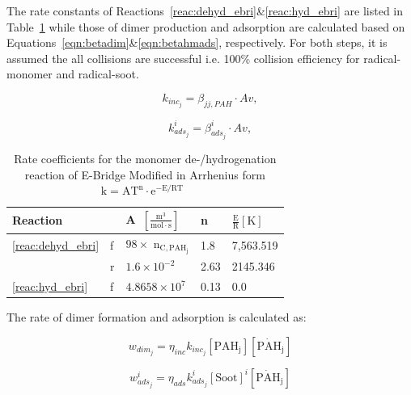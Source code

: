 

The rate constants of Reactions~\eqref{reac:dehyd_ebri}\&\eqref{reac:hyd_ebri} are listed in Table~\ref{tab:Ebridge} while those of dimer production and adsorption are calculated based on Equations~\eqref{eqn:betadim}\&\eqref{eqn:betahmads}, respectively. For both steps, it is assumed the all collisions are successful i.e. 100\% collision efficiency for radical-monomer and radical-soot.

\begin{equation}
	k_{inc_j}=
	\beta_{jj,PAH}\cdot Av
	\label{eqn:kdim_ebri},
\end{equation}

\begin{equation}
	k^i_{ads_{j}}=
	\beta^i_{ads_j}\cdot Av
	\label{eqn:kads_ebir},
\end{equation}

\begin{table}
	\caption{Rate coefficients for the monomer de-/hydrogenation reaction of E-Bridge Modified in Arrhenius form $\mathrm{k=AT^n\cdot e^{-E/RT}}$~\citep{frenklach2020mechanism}}
	\label{tab:Ebridge}
	\centering
	\begin{tabular}{l l l l l}
		\hline
		Reaction & \hspace{0.1cm} & A~$\mathrm{\left[ \frac{m^3}{mol\cdot s} \right]}$ & n & $\mathrm{\frac{E}{R} [K]}$  \\
		\hline
		\eqref{reac:dehyd_ebri} & f & $98\times$ $\mathrm{n_{C, PAH_j}}$ & 1.8 & 7,563.519 \\
		& r & $1.6\times 10^{-2}$ & 2.63 & 2145.346\\
		\eqref{reac:hyd_ebri} & f & $4.8658\times10^7
		$ & 0.13 & 0.0\\
		\hline
	\end{tabular}
\end{table}

The rate of dimer formation and adsorption is calculated as:

\begin{equation}
	w_{dim_j} = \eta_{inc} k_{inc_{j}} [\mathrm{PAH_j}] [\mathrm{\dot{PAH}_j}]
	\label{eqn:wdim_ebri}
\end{equation}

\begin{equation}
	w^i_{ads_j} = \eta_{ads} k^i_{ads_{j}} [\mathrm{Soot}]^i [\mathrm{\dot{PAH}_j}]
\end{equation}

